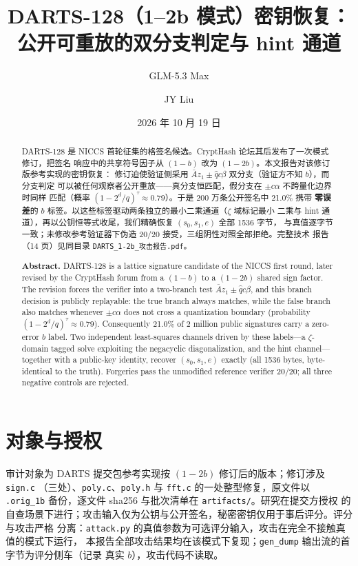 \documentclass[UTF8,11pt,a4paper]{ctexart}
\title{\vspace{-1.2cm}\textbf{DARTS-128（1--2b 模式）密钥恢复：\\公开可重放的双分支判定与 hint 通道}}
\author{GLM-5.3 Max \and JY Liu}
\date{2026 年 10 月 19 日}
\newcommand{\code}[1]{\texttt{\small #1}}
\begin{document}
\maketitle
\thispagestyle{fancy}

\begin{abstract}\noindent
DARTS-128 是 NICCS 首轮征集的格签名候选。CryptHash 论坛其后发布了一次模式修订，把签名
响应中的共享符号因子从 $(1-b)$ 改为 $(1-2b)$。本文报告对该修订版参考实现的密钥恢复：
修订迫使验证侧采用 $\bar A z_1 \pm \hat q c\beta$ 双分支（验证方不知 $b$），而分支判定
可以被任何观察者公开重放——真分支恒匹配，假分支在 $\pm c\alpha$ 不跨量化边界时同样
匹配（概率 $(1-2^d/q)^{\tau} \approx 0.79$）。于是 200 万条公开签名中 21.0\% 携带
\textbf{零误差}的 $b$ 标签。以这些标签驱动两条独立的最小二乘通道（$\zeta$ 域标记最小
二乘与 hint 通道），再以公钥恒等式收尾，我们精确恢复 $(s_0, s_1, e)$ 全部 1536 字节，
与真值逐字节一致；未修改参考验证器下伪造 20/20 接受，三组阴性对照全部拒绝。完整技术
报告（14 页）见同目录 \code{DARTS\_1-2b\_攻击报告.pdf}。

\medskip\noindent\textbf{Abstract.}
DARTS-128 is a lattice signature candidate of the NICCS first round, later
revised by the CryptHash forum from a $(1-b)$ to a $(1-2b)$ shared sign factor.
The revision forces the verifier into a two-branch test $\bar A z_1 \pm \hat q
c\beta$, and this branch decision is publicly replayable: the true branch always
matches, while the false branch also matches whenever $\pm c\alpha$ does not
cross a quantization boundary (probability $(1-2^d/q)^{\tau}\approx 0.79$).
Consequently 21.0\% of 2 million public signatures carry a zero-error $b$ label.
Two independent least-squares channels driven by these labels---a $\zeta$-domain
tagged solve exploiting the negacyclic diagonalization, and the hint
channel---together with a public-key identity, recover $(s_0,s_1,e)$ exactly
(all 1536 bytes, byte-identical to the truth). Forgeries pass the unmodified
reference verifier 20/20; all three negative controls are rejected.
\end{abstract}

\section{对象与授权}

审计对象为 DARTS 提交包参考实现按 $(1-2b)$ 修订后的版本；修订涉及 \code{sign.c}
（三处）、\code{poly.c}、\code{poly.h} 与 \code{fft.c} 的一处整型修复，原文件以
\code{*.orig\_1b} 备份，逐文件 sha256 与批次清单在 \code{artifacts/}。研究在提交方授权
的自查场景下进行；攻击输入仅为公钥与公开签名，秘密密钥仅用于事后评分。评分与攻击严格
分离：\code{attack.py} 的真值参数为可选评分输入，攻击在完全不接触真值的模式下运行，
本报告全部攻击结果均在该模式下复现；\code{gen\_dump} 输出流的首字节为评分侧车（记录
真实 $b$），攻击代码不读取。
\end{document}
